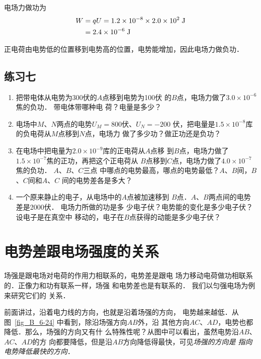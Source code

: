 \begin{solution}
电场力做功为
\[\begin{split}
    W&=qU=1.2\times10^{-8}\times2.0\times10^2 \;\text{J} \\
&=2.4\times10^{-6} \;\text{J}
\end{split} \]

正电荷由电势低的位置移到电势高的位置，电势能增加，因此电场力做负功．
\end{solution}

\subsection*{练习七}

\begin{enumerate}
    \item 把带电体从电势为300伏的$A$点移到电势为100伏
的$B$点，电场力做了$3.0\times10^{-6}$焦的负功．
带电体带哪种电
荷？电量是多少？
\item 电场中$M$、$N$两点的电势$U_M=800$伏、$U_N=-200$
伏，把电量是$1.5\times10^{-8}$库的负电荷从$M$点移到$N$点，电场力
做了多少功？做正功还是负功？
\item 在电场中把电量为$2.0\times10^{-9}$库的正电荷从$A$点移
到$B$点，电场力做了$1.5\times10^{-7}$焦的正功，再把这个正电荷从
$B$点移到$C$点，电场力做了$4.0\times10^{-7}$焦的负功．
$A$、$B$、$C$三点
中哪点的电势最高，哪点的电势最低？$A$、$B$间，$B$、$C$间和$A$、$C$
间的电势差各是多大？
\item 一个原来静止的电子，从电场中的$A$点被加速移到
$B$点．$A$、$B$两点间的电势差是2000伏．
电场力所做的功是多
少电子伏？电势能的变化是多少电子伏？设电子是在真空中
移动的，电子在$B$点获得的动能是多少电子伏？
\end{enumerate}


\section{电势差跟电场强度的关系}
场强是跟电场对电荷的作用力相联系的，电势差是跟电
场力移动电荷做功相联系的．正像力和功有联系一样，场强
和电势差也是有联系的．
我们以匀强电场为例来研究它们的
关系．


前面讲过，沿着电力线的方向，也就是沿着场强的方向，
电势越来越低．从图~\ref{fig_B_6-24} 中看到，除沿场强方向$AB$外，沿
其他方向$AC$、$AD$，电势也都降低．那么，场强的方向又有什
么特殊性呢？从图中可以看出，虽然电势沿$AB$、$AC$、$AD$的方
向都要降低，但是沿$AB$方向降低得最快，可见\textit{场强的方向是
指向电势降低最快的方向}．

